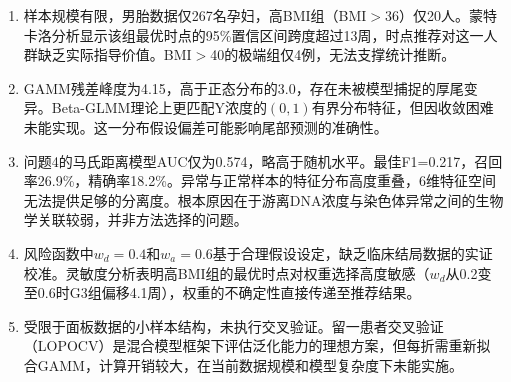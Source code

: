 \begin{enumerate}[label=（\arabic*）]
\item 样本规模有限，男胎数据仅267名孕妇，高BMI组（BMI$>$36）仅20人。蒙特卡洛分析显示该组最优时点的95\%置信区间跨度超过13周，时点推荐对这一人群缺乏实际指导价值。BMI$>$40的极端组仅4例，无法支撑统计推断。

\item GAMM残差峰度为4.15，高于正态分布的3.0，存在未被模型捕捉的厚尾变异。Beta-GLMM理论上更匹配Y浓度的$(0,1)$有界分布特征，但因收敛困难未能实现。这一分布假设偏差可能影响尾部预测的准确性。

\item 问题4的马氏距离模型AUC仅为0.574，略高于随机水平。最佳F1=0.217，召回率26.9\%，精确率18.2\%。异常与正常样本的特征分布高度重叠，6维特征空间无法提供足够的分离度。根本原因在于游离DNA浓度与染色体异常之间的生物学关联较弱，并非方法选择的问题。

\item 风险函数中$w_d=0.4$和$w_a=0.6$基于合理假设设定，缺乏临床结局数据的实证校准。灵敏度分析表明高BMI组的最优时点对权重选择高度敏感（$w_d$从0.2变至0.6时G3组偏移4.1周），权重的不确定性直接传递至推荐结果。

\item 受限于面板数据的小样本结构，未执行交叉验证。留一患者交叉验证（LOPOCV）是混合模型框架下评估泛化能力的理想方案，但每折需重新拟合GAMM，计算开销较大，在当前数据规模和模型复杂度下未能实施。
\end{enumerate}
